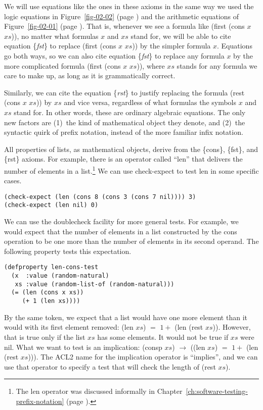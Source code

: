 We will use equations like the ones in these axioms in the
same way we used the logic equations in Figure~\ref{fig-02-02}
(page \pageref{fig-02-02}) and the arithmetic equations of
Figure~\ref{fig-02-01} (page \pageref{fig-02-01}).
That is, whenever we see a formula like (first (cons $x$ $xs$)),
no matter what formulas $x$ and $xs$ stand for,
we will be able to cite equation \{\emph{fst}\} to replace
(first (cons $x$ $xs$)) by the simpler formula $x$.
Equations go both ways, so we can also cite equation \{\emph{fst}\}
to replace any formula $x$ by the more complicated formula
(first (cons $x$ $xs$)), where $xs$ stands for any formula
we care to make up, as long as it is grammatically correct.

Similarly, we can cite the equation \{\emph{rst}\} to justify
replacing the formula (rest (cons $x$ $xs$)) by $xs$
and vice versa, regardless of what formulas the symbols $x$ and $xs$ stand for.
In other words, these are ordinary algebraic equations.
The only new factors are
(1)~the kind of mathematical object they denote, and
(2)~the syntactic quirk of prefix notation, instead of the more familiar infix notation.

All properties of lists,
as mathematical objects,
derive from the \{cons\}, \{fst\}, and \{rst\} axioms.
For example, there is an operator called ``len''
that delivers the number of elements in a list.\footnote{The
len operator was discussed informally in Chapter~\ref{ch:software-testing-prefix-notation}
(page \pageref{len-op-informal}).}
We can use check-expect to test len in some specific cases.

\begin{Verbatim}
(check-expect (len (cons 8 (cons 3 (cons 7 nil)))) 3)
(check-expect (len nil) 0)
\end{Verbatim}

We can use the doublecheck facility for more general tests.
For example, we would expect that the number of elements
in a list constructed by the cons operation to be
one more than the number of elements in its second operand.
The following property tests this expectation.

\begin{Verbatim}
(defproperty len-cons-test
  (x  :value (random-natural)
   xs :value (random-list-of (random-natural)))
  (= (len (cons x xs))
     (+ 1 (len xs))))
\end{Verbatim}

By the same token, we expect that a list would
have one more element than it would with
its first element removed: (len $xs$) $=$ $1 +$ (len (rest $xs$)).
However, that is true only if the list $xs$
has some elements. It would not be true if $xs$ were nil.
What we want to test is an implication:
(consp $xs$) $\rightarrow$ ((len $xs$) $=$ $1 +$ (len (rest $xs$))).
The ACL2 name for the implication operator is ``implies'',
and we can use that operator to specify a test that
will check the length of (rest $xs$).

